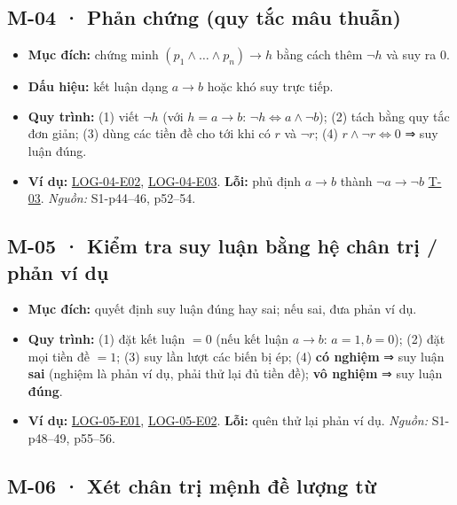 \documentclass[
  10pt,
  twoside,openany]{book}
\providecommand{\tightlist}{%
  \setlength{\itemsep}{0pt}\setlength{\parskip}{0pt}}
\begin{document}
\hypertarget{M-04}{%
\subsection{M-04 · Phản chứng (quy tắc mâu thuẫn)}\label{M-04}}

\begin{itemize}
\tightlist
\item
  \textbf{Mục đích:} chứng minh \((p_1\wedge\dots\wedge p_n)\to h\) bằng
  cách thêm \(\neg h\) và suy ra \(0\).
\item
  \textbf{Dấu hiệu:} kết luận dạng \(a\to b\) hoặc khó suy trực tiếp.
\item
  \textbf{Quy trình:} (1) viết \(\neg h\) (với \(h=a\to b\):
  \(\neg h\Leftrightarrow a\wedge\neg b\)); (2) tách bằng quy tắc đơn
  giản; (3) dùng các tiền đề cho tới khi có \(r\) và \(\neg r\); (4)
  \(r\wedge\neg r\Leftrightarrow0\) ⇒ suy luận đúng.
\item
  \textbf{Ví dụ:} \protect\hyperlink{LOG-04-E02}{LOG-04-E02},
  \protect\hyperlink{LOG-04-E03}{LOG-04-E03}. \textbf{Lỗi:} phủ định
  \(a\to b\) thành \(\neg a\to\neg b\) \protect\hyperlink{T-03}{T-03}.
  \emph{Nguồn:} S1-p44--46, p52--54.
\end{itemize}

\hypertarget{M-05}{%
\subsection{M-05 · Kiểm tra suy luận bằng hệ chân trị / phản ví
dụ}\label{M-05}}

\begin{itemize}
\tightlist
\item
  \textbf{Mục đích:} quyết định suy luận đúng hay sai; nếu sai, đưa phản
  ví dụ.
\item
  \textbf{Quy trình:} (1) đặt kết luận \(=0\) (nếu kết luận \(a\to b\):
  \(a=1,b=0\)); (2) đặt mọi tiền đề \(=1\); (3) suy lần lượt các biến bị
  ép; (4) \textbf{có nghiệm} ⇒ suy luận \textbf{sai} (nghiệm là phản ví
  dụ, phải thử lại đủ tiền đề); \textbf{vô nghiệm} ⇒ suy luận
  \textbf{đúng}.
\item
  \textbf{Ví dụ:} \protect\hyperlink{LOG-05-E01}{LOG-05-E01},
  \protect\hyperlink{LOG-05-E02}{LOG-05-E02}. \textbf{Lỗi:} quên thử lại
  phản ví dụ. \emph{Nguồn:} S1-p48--49, p55--56.
\end{itemize}

\hypertarget{M-06}{%
\subsection{M-06 · Xét chân trị mệnh đề lượng từ}\label{M-06}}
\end{document}
